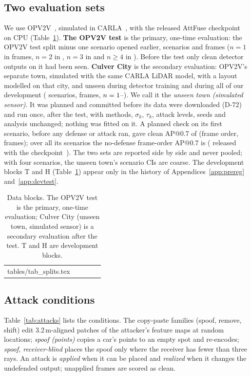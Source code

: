 \documentclass[conference]{IEEEtran}
\makeatletter
\newcommand{\Cul}{unseen town (simulated sensor)}
\newcommand{\tabin}[1]{\@@input #1 }
\makeatother
\begin{document}
\subsection{Two evaluation sets}
\label{sec:sets}
We use OPV2V~\cite{xu2022opv2v}, simulated in CARLA~\cite{dosovitskiy2017carla}, with the released AttFuse
checkpoint on CPU (Table~\ref{tab:splits}). \textbf{The OPV2V test} is the primary, one-time evaluation: the
OPV2V test split minus one scenario opened earlier, \TestScenarios{} scenarios and \TestFrames{} frames ($n=1$
in \TestNOne{} frames, $n=2$ in \TestNTwo, $n=3$ in \TestNThree{} and $n\ge 4$ in \TestNFourPlus). Before the
test only clean detector outputs on it had been seen. \textbf{Culver City} is the secondary evaluation: OPV2V's
separate town, simulated with the same CARLA LiDAR model, with a layout modelled on that city, and unseen during
detector training and during all of our development (\CulScenarios{} scenarios, \CulFrames{} frames,
$n=1$--\CulNmax). We call it the \emph{\Cul}. It was planned and committed before its data were
downloaded (D-72) and run once, after the test, with methods, $\sigma_k$, $\tau_k$, attack levels, seeds and
analysis unchanged; nothing was fitted on it. A planned check on its first scenario, before any defense or attack
ran, gave clean AP@0.7 of \CulSanityAP{} (frame order, \CulSanityFrames{} frames); over all its scenarios the
no-defense frame-order AP@0.7 is \CulAPCleanFrame{} (\CulPublishedAP{} released with the
checkpoint~\cite{xu2022opv2v}). The two sets are reported side by side and never pooled; with four scenarios,
the unseen town's scenario CIs are coarse. The development blocks T and H (Table~\ref{tab:splits}) appear only in
the history of Appendices~\ref{app:prereg} and~\ref{app:devtest}.

\begin{table}[!t]
\caption{Data blocks. The OPV2V test is the primary, one-time evaluation; Culver City (unseen town, simulated
sensor) is a secondary evaluation after the test. T and H are development blocks.}
\label{tab:splits}
\centering
\footnotesize
\setlength{\tabcolsep}{4pt}
\begin{tabular}{@{}lrrcp{4.05cm}@{}}
\toprule
\tabin{tables/tab_splits.tex}
\bottomrule
\end{tabular}
\end{table}

\subsection{Attack conditions}
\label{sec:attacks}
Table~\ref{tab:attacks} lists the \NumConditions{} conditions. The copy-paste families (spoof, remove, shift)
edit 3.2\,m-aligned patches of the attacker's feature maps at random locations; \emph{spoof (points)} copies a
car's points to an empty spot and re-encodes; \emph{spoof, receiver-blind} places the spoof only where the
receiver has fewer than three rays. An attack is \emph{applied} when it can be placed and \emph{realized} when it
changes the undefended output; unapplied frames are scored as clean.
\end{document}
